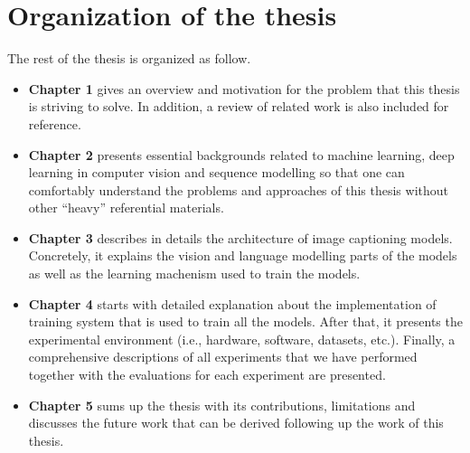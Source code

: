\section{Organization of the thesis}
	
	The rest of the thesis is organized as follow.

	\begin{itemize}[label={}]
		\item \textbf{Chapter 1} gives an overview and motivation for the problem that this thesis is striving to solve. In addition, a review of related work is also included for reference.

		\item \textbf{Chapter 2} presents essential backgrounds related to machine learning, deep learning in computer vision and sequence modelling so that one can comfortably understand the problems and approaches of this thesis without other ``heavy'' referential materials.

		\item \textbf{Chapter 3} describes in details the architecture of image captioning models. Concretely, it explains the vision and language modelling parts of the models as well as the learning machenism used to train the models.

		\item \textbf{Chapter 4} starts with detailed explanation about the implementation of training system that is used to train all the models. After that, it presents the experimental environment (i.e., hardware, software, datasets, etc.). Finally, a comprehensive descriptions of all experiments that we have performed together with the evaluations for each experiment are presented.

		\item \textbf{Chapter 5} sums up the thesis with its contributions, limitations and discusses the future work that can be derived following up the work of this thesis.
	\end{itemize}